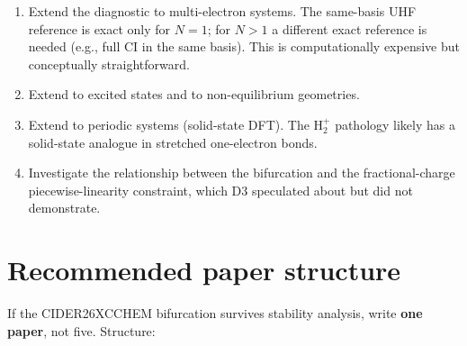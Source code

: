 \documentclass[11pt]{report}
\theoremstyle{definition}
\theoremstyle{remark}
\begin{document}
\begin{enumerate}
  \item Extend the diagnostic to multi-electron systems. The
        same-basis UHF reference is exact only for $N = 1$; for
        $N > 1$ a different exact reference is needed (e.g., full CI in
        the same basis). This is computationally expensive but
        conceptually straightforward.
  \item Extend to excited states and to non-equilibrium geometries.
  \item Extend to periodic systems (solid-state DFT). The H$_2^+$
        pathology likely has a solid-state analogue in stretched
        one-electron bonds.
  \item Investigate the relationship between the bifurcation and the
        fractional-charge piecewise-linearity constraint, which D3
        speculated about but did not demonstrate.
\end{enumerate}

\section{Recommended paper structure}
\label{sec:paper-plan}

If the CIDER26XCCHEM bifurcation survives stability analysis, write
\textbf{one paper}, not five. Structure:
\end{document}
